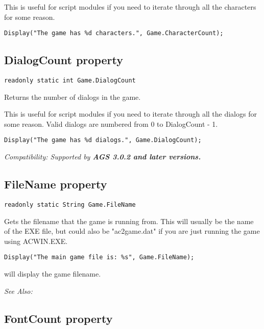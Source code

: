 This is useful for script modules if you need to iterate through all the characters for some reason.

\begin{verbatim}
Display("The game has %d characters.", Game.CharacterCount);
\end{verbatim}


\subsection{DialogCount property}\label{Game.DialogCount}%

\begin{verbatim}
readonly static int Game.DialogCount
\end{verbatim}
Returns the number of dialogs in the game.

This is useful for script modules if you need to iterate through all the dialogs for some reason.
Valid dialogs are numbered from 0 to DialogCount - 1.

\begin{verbatim}
Display("The game has %d dialogs.", Game.DialogCount);
\end{verbatim}

\it{Compatibility:} Supported by \bf{AGS 3.0.2} and later versions.


\subsection{FileName property}\label{Game.FileName}%

\begin{verbatim}
readonly static String Game.FileName
\end{verbatim}
Gets the filename that the game is running from. This will usually be the name of the EXE file,
but could also be "ac2game.dat" if you are just running the game using ACWIN.EXE.

\begin{verbatim}
Display("The main game file is: %s", Game.FileName);
\end{verbatim}
will display the game filename.

\it{See Also:} 


\subsection{FontCount property}\label{Game.FontCount}%

